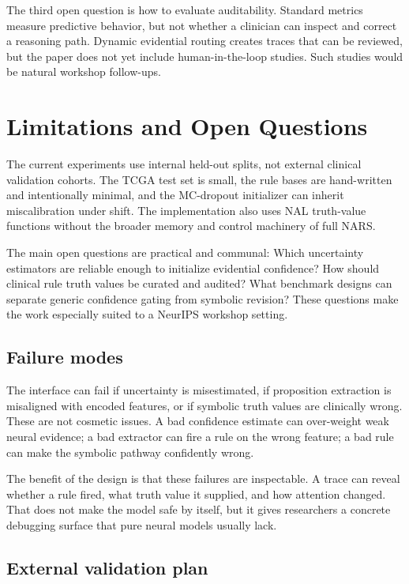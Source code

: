 \documentclass{article}
\begin{document}
The third open question is how to evaluate auditability. Standard metrics measure predictive behavior, but not whether a clinician can inspect and correct a reasoning path. Dynamic evidential routing creates traces that can be reviewed, but the paper does not yet include human-in-the-loop studies. Such studies would be natural workshop follow-ups.

\section{Limitations and Open Questions}
\label{sec:limitations}

The current experiments use internal held-out splits, not external clinical validation cohorts. The TCGA test set is small, the rule bases are hand-written and intentionally minimal, and the MC-dropout initializer can inherit miscalibration under shift. The implementation also uses NAL truth-value functions without the broader memory and control machinery of full NARS.

The main open questions are practical and communal: Which uncertainty estimators are reliable enough to initialize evidential confidence? How should clinical rule truth values be curated and audited? What benchmark designs can separate generic confidence gating from symbolic revision? These questions make the work especially suited to a NeurIPS workshop setting.

\subsection{Failure modes}

The interface can fail if uncertainty is misestimated, if proposition extraction is misaligned with encoded features, or if symbolic truth values are clinically wrong. These are not cosmetic issues. A bad confidence estimate can over-weight weak neural evidence; a bad extractor can fire a rule on the wrong feature; a bad rule can make the symbolic pathway confidently wrong.

The benefit of the design is that these failures are inspectable. A trace can reveal whether a rule fired, what truth value it supplied, and how attention changed. That does not make the model safe by itself, but it gives researchers a concrete debugging surface that pure neural models usually lack.

\subsection{External validation plan}
\end{document}
